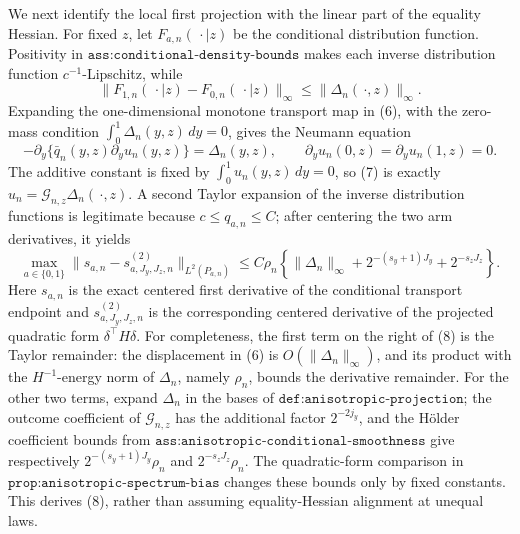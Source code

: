 We next identify the local first projection with the linear part of the equality Hessian.  For fixed \(z\), let \(F_{a,n}(\,\cdot\mid z)\) be the conditional distribution function.  Positivity in \(\texttt{ass:conditional-density-bounds}\) makes each inverse distribution function \(c^{-1}\)-Lipschitz, while
\[
\|F_{1,n}(\,\cdot\mid z)-F_{0,n}(\,\cdot\mid z)\|_\infty
\le \|\Delta_n(\,\cdot,z)\|_\infty.
\tag{6}
\]
Expanding the one-dimensional monotone transport map in (6), with the zero-mass condition \(\int_0^1\Delta_n(y,z)\,dy=0\), gives the Neumann equation
\[
-\partial_y\{\bar q_n(y,z)\partial_y u_n(y,z)\}=\Delta_n(y,z),\qquad
\partial_yu_n(0,z)=\partial_yu_n(1,z)=0.
\tag{7}
\]
The additive constant is fixed by \(\int_0^1u_n(y,z)\,dy=0\), so (7) is exactly \(u_n=\mathcal G_{n,z}\Delta_n(\,\cdot,z)\).  A second Taylor expansion of the inverse distribution functions is legitimate because \(c\le q_{a,n}\le C\); after centering the two arm derivatives, it yields
\[
\max_{a\in\{0,1\}}\|s_{a,n}-s^{(2)}_{a,J_y,J_z,n}\|_{L^2(P_{a,n})}
\le C\rho_n\!\left\{\|\Delta_n\|_\infty
+2^{-(s_y+1)J_y}+2^{-s_zJ_z}\right\}.
\tag{8}
\]
Here \(s_{a,n}\) is the exact centered first derivative of the conditional transport endpoint and \(s^{(2)}_{a,J_y,J_z,n}\) is the corresponding centered derivative of the projected quadratic form \(\delta^\top H\delta\).  For completeness, the first term on the right of (8) is the Taylor remainder: the displacement in (6) is \(O(\|\Delta_n\|_\infty)\), and its product with the \(H^{-1}\)-energy norm of \(\Delta_n\), namely \(\rho_n\), bounds the derivative remainder.  For the other two terms, expand \(\Delta_n\) in the bases of \(\texttt{def:anisotropic-projection}\); the outcome coefficient of \(\mathcal G_{n,z}\) has the additional factor \(2^{-2j_y}\), and the H\"older coefficient bounds from \(\texttt{ass:anisotropic-conditional-smoothness}\) give respectively \(2^{-(s_y+1)J_y}\rho_n\) and \(2^{-s_zJ_z}\rho_n\).  The quadratic-form comparison in \(\texttt{prop:anisotropic-spectrum-bias}\) changes these bounds only by fixed constants.  This derives (8), rather than assuming equality-Hessian alignment at unequal laws.

